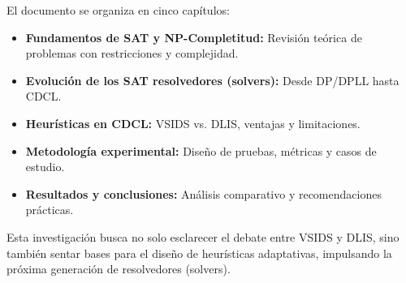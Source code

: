El documento se organiza en cinco capítulos:
\begin{itemize}
    \item \textbf{Fundamentos de SAT y NP-Completitud:} Revisión teórica de problemas con restricciones y complejidad.
    \item \textbf{Evolución de los SAT resolvedores (solvers):} Desde DP/DPLL hasta CDCL.
    \item \textbf{Heurísticas en CDCL:} VSIDS vs. DLIS, ventajas y limitaciones.
    \item \textbf{Metodología experimental:} Diseño de pruebas, métricas y casos de estudio.
    \item \textbf{Resultados y conclusiones:} Análisis comparativo y recomendaciones prácticas.
\end{itemize}

Esta investigación busca no solo esclarecer el debate entre VSIDS y DLIS, sino también sentar bases para el diseño de heurísticas adaptativas, impulsando la próxima generación de resolvedores (solvers).
